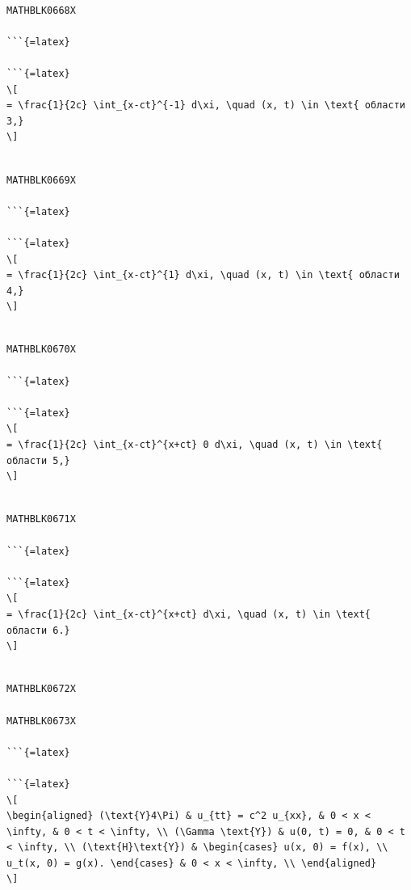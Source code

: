 \documentclass[
]{article}
\begin{document}
\begin{verbatim}

MATHBLK0668X

```{=latex}

```{=latex}
\[
= \frac{1}{2c} \int_{x-ct}^{-1} d\xi, \quad (x, t) \in \text{ области 3,}
\]
\end{verbatim}

\begin{verbatim}

MATHBLK0669X

```{=latex}

```{=latex}
\[
= \frac{1}{2c} \int_{x-ct}^{1} d\xi, \quad (x, t) \in \text{ области 4,}
\]
\end{verbatim}

\begin{verbatim}

MATHBLK0670X

```{=latex}

```{=latex}
\[
= \frac{1}{2c} \int_{x-ct}^{x+ct} 0 d\xi, \quad (x, t) \in \text{ области 5,}
\]
\end{verbatim}

\begin{verbatim}

MATHBLK0671X

```{=latex}

```{=latex}
\[
= \frac{1}{2c} \int_{x-ct}^{x+ct} d\xi, \quad (x, t) \in \text{ области 6.}
\]
\end{verbatim}

\begin{verbatim}

MATHBLK0672X

MATHBLK0673X

```{=latex}

```{=latex}
\[
\begin{aligned} (\text{Y}4\Pi) & u_{tt} = c^2 u_{xx}, & 0 < x < \infty, & 0 < t < \infty, \\ (\Gamma \text{Y}) & u(0, t) = 0, & 0 < t < \infty, \\ (\text{H}\text{Y}) & \begin{cases} u(x, 0) = f(x), \\ u_t(x, 0) = g(x). \end{cases} & 0 < x < \infty, \\ \end{aligned}
\]
\end{verbatim}
\end{document}
